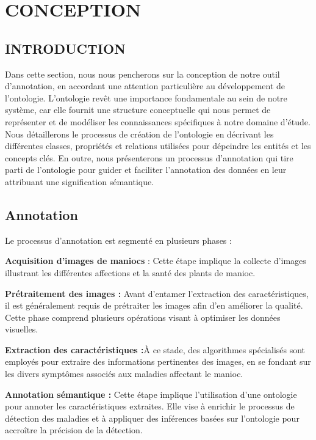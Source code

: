 \chapter{CONCEPTION}
\begin{spacing}{1.2}
\minitoc
\thispagestyle{MyStyle}
\end{spacing}
\newpage

\section{INTRODUCTION}
\quad Dans cette section, nous nous pencherons sur la conception de notre outil d'annotation, en accordant une attention particulière au développement de l'ontologie. L'ontologie revêt une importance fondamentale au sein de notre système, car elle fournit une structure conceptuelle qui nous permet de représenter et de modéliser les connaissances spécifiques à notre domaine d'étude. Nous détaillerons le processus de création de l'ontologie en décrivant les différentes classes, propriétés et relations utilisées pour dépeindre les entités et les concepts clés. En outre, nous présenterons un processus d'annotation qui tire parti de l'ontologie pour guider et faciliter l'annotation des données en leur attribuant une signification sémantique.\par

\section{Annotation}
Le processus d'annotation est segmenté en plusieurs phases :

\textemdash \textbf{ Acquisition d'images de maniocs }: Cette étape implique la collecte d'images illustrant les différentes affections et la santé des plants de manioc.

\textemdash \textbf{ Prétraitement des images : }Avant d'entamer l'extraction des caractéristiques, il est généralement requis de prétraiter les images afin d'en améliorer la qualité. Cette phase comprend plusieurs opérations visant à optimiser les données visuelles.

\textemdash \textbf{ Extraction des caractéristiques :}À ce stade, des algorithmes spécialisés sont employés pour extraire des informations pertinentes des images, en se fondant sur les divers symptômes associés aux maladies affectant le manioc.

\textemdash \textbf{ Annotation sémantique : }Cette étape implique l'utilisation d'une ontologie pour annoter les caractéristiques extraites. Elle vise à enrichir le processus de détection des maladies et à appliquer des inférences basées sur l'ontologie pour accroître la précision de la détection.

